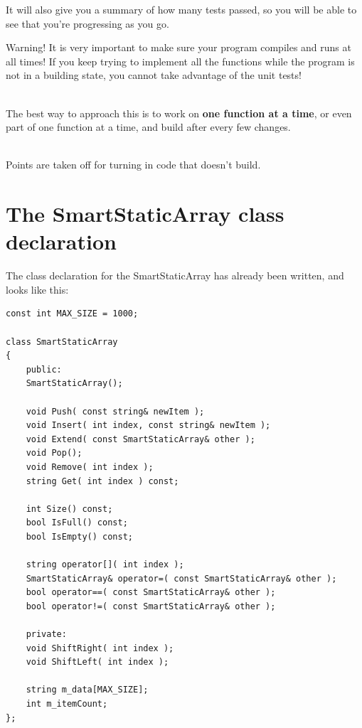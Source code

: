 \documentclass[a4paper,12pt]{book}
\begin{document}
            It will also give you a summary of how many tests passed,
            so you will be able to see that you're progressing as you go.

            \begin{error}{Warning!}
                It is very important to make sure your program compiles
                and runs at all times! If you keep trying to implement
                all the functions while the program is not in a building
                state, you cannot take advantage of the unit tests!
                
                ~\\
                The best way to approach this is to work on
                \textbf{one function at a time}, or even part of one
                function at a time, and build after every few changes.

                ~\\
                Points are taken off for turning in code that doesn't build.
            \end{error}

\newpage
\section*{The SmartStaticArray class declaration}

        The class declaration for the SmartStaticArray has already been
        written, and looks like this:

\begin{lstlisting}[style=code]
const int MAX_SIZE = 1000;

class SmartStaticArray
{
    public:
    SmartStaticArray();

    void Push( const string& newItem );
    void Insert( int index, const string& newItem );
    void Extend( const SmartStaticArray& other );
    void Pop();
    void Remove( int index );
    string Get( int index ) const;

    int Size() const;
    bool IsFull() const;
    bool IsEmpty() const;

    string operator[]( int index );
    SmartStaticArray& operator=( const SmartStaticArray& other );
    bool operator==( const SmartStaticArray& other );
    bool operator!=( const SmartStaticArray& other );

    private:
    void ShiftRight( int index );
    void ShiftLeft( int index );

    string m_data[MAX_SIZE];
    int m_itemCount;
};
\end{lstlisting}
\end{document}

